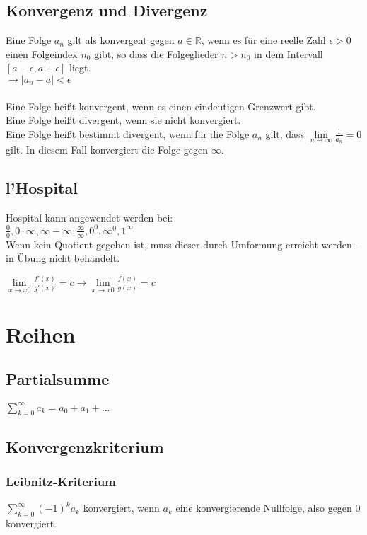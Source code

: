 \documentclass[a4paper,landscape, 11pt]{article}
\newcommand{\limFromTo}[2]{ \lim\limits_{#2 \rightarrow #1}}
\begin{document}
\begin{multicols}{5}
\begin{small}
        \subsection{Konvergenz und Divergenz}
            
            Eine Folge $a_n$ gilt als konvergent gegen $a \in \mathbb{R}$, wenn es für eine reelle Zahl $\epsilon > 0$ einen Folgeindex $n_0$ gibt, so dass die Folgeglieder $n>n_0$ in dem Intervall $\left[ a - \epsilon, a + \epsilon \right] $ liegt.\\
            $\rightarrow | a_n - a | < \epsilon$
            \\ \\
            Eine Folge heißt konvergent, wenn es einen eindeutigen Grenzwert gibt. \\
            Eine Folge heißt divergent, wenn sie nicht konvergiert. \\
            Eine Folge heißt bestimmt divergent, wenn für die Folge $a_n$ gilt, dass $\limFromTo{\infty}{n}\frac{1}{a_n} = 0$ gilt. In diesem Fall konvergiert die Folge gegen $\infty$.
        \subsection{l'Hospital}
            Hospital kann angewendet werden bei: \\
            $\frac{0}{0}, 0 \cdot \infty, \infty - \infty, \frac{\infty}{\infty}, 0^0, \infty^0, 1^\infty$\\
            Wenn kein Quotient gegeben ist, muss dieser durch Umformung erreicht werden - in Übung nicht behandelt.
            
            $\limFromTo{x0}{x} \frac{f'(x)}{g'(x)} = c \rightarrow \limFromTo{x0}{x} \frac{f(x)}{g(x)} = c$
            
    
    \section{Reihen}
        \subsection{Partialsumme}
            $\sum_{k=0}^{\infty} a_k = a_0 + a_1 + ... $
        \subsection{Konvergenzkriterium}
            \subsubsection{Leibnitz-Kriterium}
                \noindent$\sum_{k=0}^{\infty} (-1)^k a_k$ konvergiert, wenn $a_k$ eine konvergierende Nullfolge, also gegen 0 konvergiert.        

\end{small}
\end{multicols}
\end{document}
